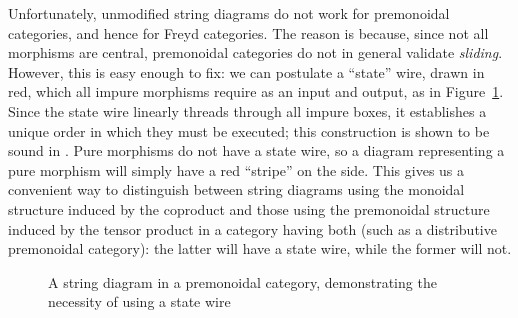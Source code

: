 \documentclass[acmsmall,screen,review]{acmart}
\newcommand{\nats}{\mathbb{N}}
\begin{document}
Unfortunately, unmodified string diagrams do not work for premonoidal categories, and hence for
Freyd categories. The reason is because, since not all morphisms are central, premonoidal categories
do not in general validate \emph{sliding}. However, this is easy enough to fix: we can postulate a
``state'' wire, drawn in red, which all impure morphisms require as an input and output, as in
Figure~\ref{fig:premonoidal-string-diagram}. Since the state wire linearly threads through all
impure boxes, it establishes a unique order in which they must be executed; this construction is
shown to be sound in \citet{promonad}. Pure morphisms do not have a state wire, so a diagram
representing a pure morphism will simply have a red ``stripe'' on the side. This gives us a
convenient way to distinguish between string diagrams using the monoidal structure induced by the
coproduct and those using the premonoidal structure induced by the tensor product in a category
having both (such as a distributive premonoidal category): the latter will have a state wire, while
the former will not.

\begin{figure}
  \caption{
    A string diagram in a premonoidal category, demonstrating the necessity of using a state wire
  }
  \label{fig:premonoidal-string-diagram}
\end{figure}
\end{document}
